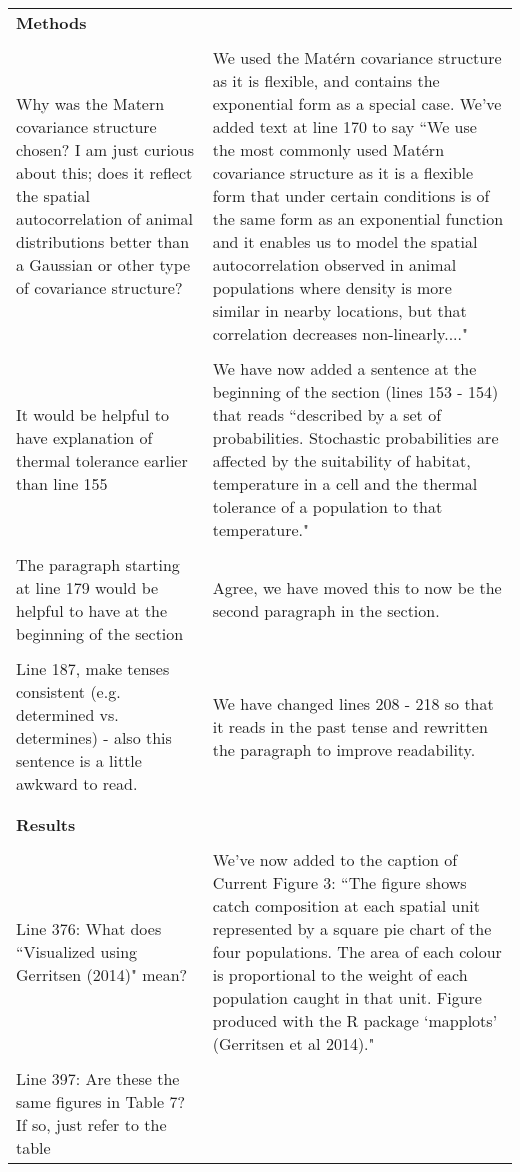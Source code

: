 \documentclass[10pt]{letter}
\begin{document}
\begin{center}
\begin{longtable}{p{8cm} | p{8cm}}
		\textbf{Methods} &  \\
\\
Why was the Matern covariance structure chosen? I am just curious about this;
does it reflect the spatial autocorrelation of animal distributions better than
a Gaussian or other type of covariance structure? & We used the Matérn
covariance structure as it is flexible, and contains the exponential form as a
special case.  We've added text at line 170 to say ``We use the most commonly
used Matérn covariance structure as it is a flexible form that under certain
conditions is of the same form as an exponential function and it enables us to
model the spatial autocorrelation observed in animal populations where density
is more similar in nearby locations, but that correlation decreases
non-linearly...." \\ 
\\
It would be helpful to have explanation of thermal tolerance earlier than line
155 & We have now added a sentence at the beginning of the section (lines 153 -
154) that reads ``described by a set of probabilities.  Stochastic
probabilities are affected by the suitability of habitat, temperature in a cell
and the thermal tolerance of a population to that temperature." \\
\\
The paragraph starting at line 179 would be helpful to have at the beginning of
the section & Agree, we have moved this to now be the second paragraph in the
section. \\
\\
Line 187, make tenses consistent (e.g. determined vs. determines) - also this
sentence is a little awkward to read. & We have changed lines 208 - 218
so that it reads in the past tense and rewritten the paragraph to improve
readability. \\
\\
\hline
\\
\textbf{Results} &  \\
\\
Line 376: What does ``Visualized using Gerritsen (2014)" mean? & We've now
added to the caption of Current Figure 3: ``The figure shows catch composition
at each spatial unit represented by a square pie chart of the four populations.
The area of each colour is proportional to the weight of each population caught
in that unit. Figure produced with the R package `mapplots' (Gerritsen et al
2014)." \\ 
\\
Line 397: Are these the same figures in Table 7? If so, just refer to the table

\end{longtable}
\end{center}
\end{document}
